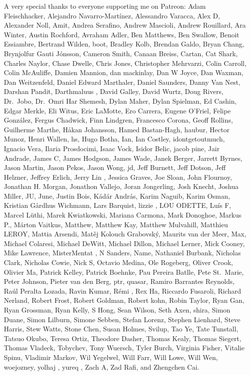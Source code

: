 \documentclass[
  letterpaper,
  DIV=11,
  numbers=noendperiod]{scrartcl}
\begin{document}
A very special thanks to everyone supporting me on Patreon: Adam
Fleischhacker, Alejandro Navarro-Martínez, Alessandro Varacca, Alex D,
Alexander Noll, Amit, Andrea Serafino, Andrew Mascioli, Andrew
Rouillard, Ara Winter, Austin Rochford, Avraham Adler, Ben Matthews, Ben
Swallow, Benoit Essiambre, Bertrand Wilden, boot, Bradley Kolb, Brendan
Galdo, Bryan Chang, Brynjolfur Gauti Jónsson, Cameron Smith, Canaan
Breiss, Cartan, Cat Shark, Charles Naylor, Chase Dwelle, Chris Jones,
Christopher Mehrvarzi, Colin Carroll, Colin McAuliffe, Damien Mannion,
dan mackinlay, Dan W Joyce, Dan Waxman, Dan Weitzenfeld, Daniel Edward
Marthaler, Daniel Saunders, Danny Van Nest, Darshan Pandit, Darthmaluus
, David Galley, David Wurtz, Doug Rivers, Dr.~Jobo, Dr.~Omri Har
Shemesh, Dylan Maher, Dylan Spielman, Ed Cashin, Edgar Merkle, Eli
Witus, Eric LaMotte, Ero Carrera, Eugene O'Friel, Felipe González,
Fergus Chadwick, Finn Lindgren, Francesco Corona, Geoff Rollins,
Guilherme Marthe, Håkan Johansson, Hamed Bastan-Hagh, haubur, Hector
Munoz, Henri Wallen, hs, Hugo Botha, Ian, Ian Costley, idontgetoutmuch,
Ignacio Vera, Ilaria Prosdocimi, Isaac Vock, Isidor Belic, jacob pine,
Jair Andrade, James C, James Hodgson, James Wade, Janek Berger, Jarrett
Byrnes, Jason Martin, Jason Pekos, Jason Wong, jd, Jeff Burnett, Jeff
Dotson, Jeff Helzner, Jeffrey Erlich, Jerry Lin , Jessica Graves, Joe
Sloan, John Flournoy, Jonathan H. Morgan, Jonathon Vallejo, Joran
Jongerling, Josh Knecht, Joshua Miller, JU, June, Justin Bois, Kádár
András, Karim Naguib, Karim Osman, Kristian Gårdhus Wichmann, Lars
Barquist, lizzie , LOU ODETTE, Luís F, Marcel Lüthi, Marek Kwiatkowski,
Mariana Carmona, Mark Donoghoe, Markus P., Márton Vaitkus, Matthew,
Matthew Kay, Matthew Mulvahill, Matthieu LEROY, Mattia Arsendi, Matěj
Kolouch Grabovský, Maurits van der Meer, Max, Michael Colaresi, Michael
DeWitt, Michael Dillon, Michael Lerner, Mick Cooney, Mike Lawrence,
MisterMentat , N Sanders, Name, Nathaniel Burbank, Nicholas Clark,
Nicholas Cowie, Nick S, Octavio Medina, Ole Rogeberg, Oliver Crook,
Olivier Ma, Patrick Kelley, Patrick Boehnke, Pau Pereira Batlle, Pete
St.~Marie, Peter Johnson, Pieter van den Berg, ptr, quasar, Ramiro
Barrantes Reynolds, Raúl Peralta Lozada, Ravin Kumar, Rémi , Rex Ha,
Riccardo Fusaroli, Richard Nerland, Robert Frost, Robert Goldman, Robert
kohn, Robin Taylor, Ryan Gan, Ryan Grossman, Ryan Kelly, S Hong, Sean
Wilson, Seth Axen, shira, Simon Duane, Simon Lilburn, Simone Sebben,
Stefan Lorenz, Stephen Lienhard, Steve Harris, Stew Watts, Stone Chen,
Susan Holmes, Svilup, Tao Ye, Tate Tunstall, Tatsuo Okubo, Teresa Ortiz,
Theodore Dasher, Thomas Kealy, Thomas Siegert, Thomas Vladeck, Tobychev,
Tony Wuersch, Tyler Burch, Virginia Fisher, Vitalie Spinu, Vladimir
Markov, Wil Yegelwel, Will Farr, Will Lowe, Will Wen, woejozney, yolhaj
, yureq , Zach A, Zad Rafi, and Zhengchen Cai.
\end{document}
